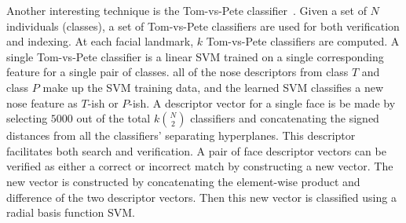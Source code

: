         Another interesting technique is the Tom-vs-Pete classifier~\cite{berg_tomvspete_2012}. Given a set of $N$
        individuals (classes), a set of Tom-vs-Pete classifiers are used for both verification and indexing. At each
        facial landmark, $k$ Tom-vs-Pete classifiers are computed. A single Tom-vs-Pete classifier is a linear SVM
        trained on a single corresponding feature for a single pair of classes. \Eg{} all of the nose descriptors from
        class $T$ and class $P$ make up the SVM training data, and the learned SVM classifies a new nose feature as
        $T$-ish or $P$-ish. A descriptor vector for a single face is be made by selecting $5000$ out of the total
        $k\binom{N}{2}$ classifiers and concatenating the signed distances from all the classifiers' separating
        hyperplanes. This descriptor facilitates both search and verification. A pair of face descriptor vectors can be
        verified as either a correct or incorrect match by constructing a new vector. The new vector is constructed by
        concatenating the element-wise product and difference of the two descriptor vectors. Then this new vector is
        classified using a radial basis function SVM{}.


